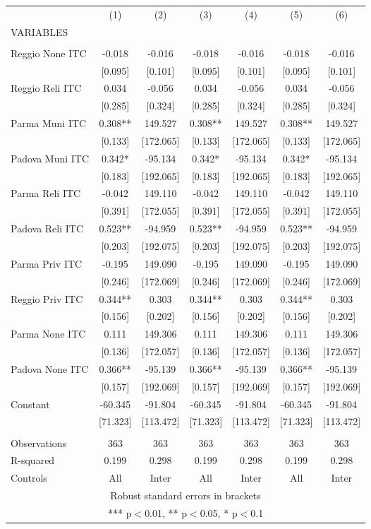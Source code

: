 \begin{tabular}{lcccccc} \hline
 & (1) & (2) & (3) & (4) & (5) & (6) \\
VARIABLES &  &  &  &  &  &  \\ \hline
 &  &  &  &  &  &  \\
Reggio None ITC & -0.018 & -0.016 & -0.018 & -0.016 & -0.018 & -0.016 \\
 & [0.095] & [0.101] & [0.095] & [0.101] & [0.095] & [0.101] \\
Reggio Reli ITC & 0.034 & -0.056 & 0.034 & -0.056 & 0.034 & -0.056 \\
 & [0.285] & [0.324] & [0.285] & [0.324] & [0.285] & [0.324] \\
Parma Muni ITC & 0.308** & 149.527 & 0.308** & 149.527 & 0.308** & 149.527 \\
 & [0.133] & [172.065] & [0.133] & [172.065] & [0.133] & [172.065] \\
Padova Muni ITC & 0.342* & -95.134 & 0.342* & -95.134 & 0.342* & -95.134 \\
 & [0.183] & [192.065] & [0.183] & [192.065] & [0.183] & [192.065] \\
Parma Reli ITC & -0.042 & 149.110 & -0.042 & 149.110 & -0.042 & 149.110 \\
 & [0.391] & [172.055] & [0.391] & [172.055] & [0.391] & [172.055] \\
Padova Reli ITC & 0.523** & -94.959 & 0.523** & -94.959 & 0.523** & -94.959 \\
 & [0.203] & [192.075] & [0.203] & [192.075] & [0.203] & [192.075] \\
Parma Priv ITC & -0.195 & 149.090 & -0.195 & 149.090 & -0.195 & 149.090 \\
 & [0.246] & [172.069] & [0.246] & [172.069] & [0.246] & [172.069] \\
Reggio Priv ITC & 0.344** & 0.303 & 0.344** & 0.303 & 0.344** & 0.303 \\
 & [0.156] & [0.202] & [0.156] & [0.202] & [0.156] & [0.202] \\
Parma None ITC & 0.111 & 149.306 & 0.111 & 149.306 & 0.111 & 149.306 \\
 & [0.136] & [172.057] & [0.136] & [172.057] & [0.136] & [172.057] \\
Padova None ITC & 0.366** & -95.139 & 0.366** & -95.139 & 0.366** & -95.139 \\
 & [0.157] & [192.069] & [0.157] & [192.069] & [0.157] & [192.069] \\
Constant & -60.345 & -91.804 & -60.345 & -91.804 & -60.345 & -91.804 \\
 & [71.323] & [113.472] & [71.323] & [113.472] & [71.323] & [113.472] \\
 &  &  &  &  &  &  \\
Observations & 363 & 363 & 363 & 363 & 363 & 363 \\
R-squared & 0.199 & 0.298 & 0.199 & 0.298 & 0.199 & 0.298 \\
 Controls & All & Inter & All & Inter & All & Inter \\ \hline
\multicolumn{7}{c}{ Robust standard errors in brackets} \\
\multicolumn{7}{c}{ *** p$<$0.01, ** p$<$0.05, * p$<$0.1} \\
\end{tabular}
